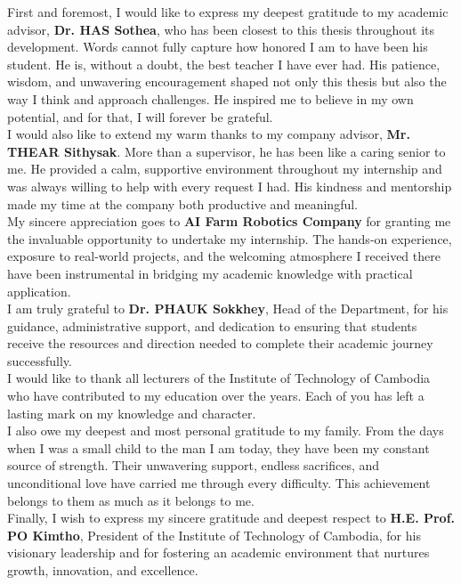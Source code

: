 First and foremost, I would like to express my deepest gratitude to my academic advisor, \textbf{Dr. HAS Sothea}, who has been closest to this thesis throughout its development. Words cannot fully capture how honored I am to have been his student. He is, without a doubt, the best teacher I have ever had. His patience, wisdom, and unwavering encouragement shaped not only this thesis but also the way I think and approach challenges. He inspired me to believe in my own potential, and for that, I will forever be grateful.\\

I would also like to extend my warm thanks to my company advisor, \textbf{Mr. THEAR Sithysak}. More than a supervisor, he has been like a caring senior to me. He provided a calm, supportive environment throughout my internship and was always willing to help with every request I had. His kindness and mentorship made my time at the company both productive and meaningful.\\

My sincere appreciation goes to \textbf{AI Farm Robotics Company} for granting me the invaluable opportunity to undertake my internship. The hands-on experience, exposure to real-world projects, and the welcoming atmosphere I received there have been instrumental in bridging my academic knowledge with practical application.\\

I am truly grateful to \textbf{Dr. PHAUK Sokkhey}, Head of the Department, for his guidance, administrative support, and dedication to ensuring that students receive the resources and direction needed to complete their academic journey successfully.\\

I would like to thank all lecturers of the Institute of Technology of Cambodia who have contributed to my education over the years. Each of you has left a lasting mark on my knowledge and character.\\

I also owe my deepest and most personal gratitude to my family. From the days when I was a small child to the man I am today, they have been my constant source of strength. Their unwavering support, endless sacrifices, and unconditional love have carried me through every difficulty. This achievement belongs to them as much as it belongs to me.\\

Finally, I wish to express my sincere gratitude and deepest respect to \textbf{H.E. Prof. PO Kimtho}, President of the Institute of Technology of Cambodia, for his visionary leadership and for fostering an academic environment that nurtures growth, innovation, and excellence.